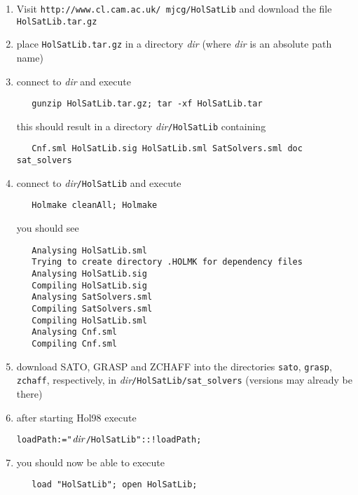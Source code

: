 \documentclass[12pt]{article}
\newcommand\Hol{Hol98\xspace}
\begin{document}
\begin{enumerate}

\item Visit {\tt http://www.cl.cam.ac.uk/~mjcg/HolSatLib} and
download the file {\tt HolSatLib.tar.gz}

\item place  {\tt HolSatLib.tar.gz} in a directory {\it dir}
(where {\it dir} is an absolute path name)

\item connect to {\it dir} and execute\\[-9mm]
{\small\begin{verbatim}
   gunzip HolSatLib.tar.gz; tar -xf HolSatLib.tar
\end{verbatim}}
\vspace*{-4mm}
this should result in a directory {\it dir}{\tt/HolSatLib} containing
\vspace*{-4mm}
{\small\begin{verbatim}
   Cnf.sml HolSatLib.sig HolSatLib.sml SatSolvers.sml doc sat_solvers
\end{verbatim}}

\item connect to {\it dir}{\tt/HolSatLib} and execute\\[-9mm]
{\small\begin{verbatim}
   Holmake cleanAll; Holmake
\end{verbatim}}
\vspace*{-4mm}
you should see
\vspace*{-4mm}
{\small\begin{verbatim}
   Analysing HolSatLib.sml
   Trying to create directory .HOLMK for dependency files
   Analysing HolSatLib.sig
   Compiling HolSatLib.sig
   Analysing SatSolvers.sml
   Compiling SatSolvers.sml
   Compiling HolSatLib.sml
   Analysing Cnf.sml
   Compiling Cnf.sml
\end{verbatim}}

\item download SATO, GRASP and ZCHAFF into the directories {\tt sato}, {\tt grasp},
{\tt zchaff}, respectively, in {\it dir}{\tt/HolSatLib/sat\_solvers}
(versions may already be there)

\item after starting \Hol execute\\[-9mm]
{\small\begin{alltt}
   loadPath := "\({\it{dir}}\)/HolSatLib" :: !loadPath;
\end{alltt}}

\item you should now be able to execute\\[-9mm]
{\small\begin{verbatim}
   load "HolSatLib"; open HolSatLib;
\end{verbatim}}
\end{enumerate}
\end{document}
